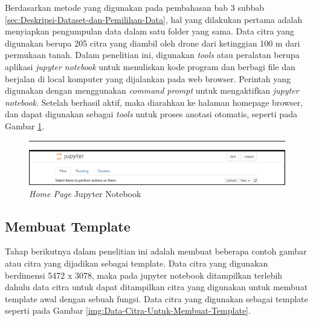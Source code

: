 Berdasarkan metode yang digunakan pada pembahasan bab 3 subbab \ref{sec:Deskripsi-Dataset-dan-Pemilihan-Data}, hal yang dilakukan pertama adalah menyiapkan pengumpulan data dalam satu folder yang sama. Data citra yang digunakan berupa 205 citra yang diambil oleh drone dari ketinggian 100 m dari permukaan tanah. Dalam penelitian ini, digunakan \textit{tools} atau peralatan berupa aplikasi \textit{jupyter notebook} untuk menuliskan kode program dan berbagi file dan berjalan di local komputer yang dijalankan pada web browser. Perintah yang digunakan dengan menggunakan \textit{command prompt} untuk mengaktifkan \textit{jupyter notebook}. Setelah berhasil aktif, maka diarahkan ke halaman homepage browser, dan dapat digunakan sebagai \textit{tools} untuk proses anotasi otomatis, seperti pada Gambar \ref{img:Home-Page-Jupyteer-Notebook}.

\begin{figure}[H]
	\vspace{-0.1cm}
	\rule{\columnwidth}{0.1pt}
	\begin{center}
		\includegraphics[width=1\columnwidth]{bab4/Gambar/Picture10.png}
	\end{center}
	\vspace{-0.2cm}
	\captionsetup{justification=centering}
	\caption{\textit{Home Page} Jupyter Notebook}\label{img:Home-Page-Jupyteer-Notebook}
\end{figure}

\subsection{Membuat Template}
\label{sec:Membuat-Template}
\hspace{1,2cm}
Tahap berikutnya dalam penelitian ini adalah membuat beberapa contoh gambar atau citra yang dijadikan sebagai template. Data citra yang digunakan berdimensi 5472 x 3078, maka pada jupyter notebook ditampilkan terlebih dahulu data citra untuk dapat ditampilkan citra yang digunakan untuk membuat template awal dengan sebuah fungsi. Data citra yang digunakan sebagai template seperti pada Gambar \ref{img:Data-Citra-Untuk-Membuat-Template}. 

